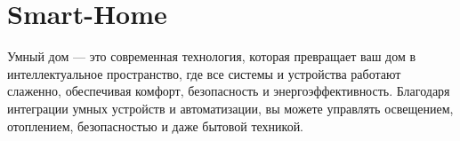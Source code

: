\chapter{Smart-\/\+Home}
\hypertarget{md__r_e_a_d_m_e}{}\label{md__r_e_a_d_m_e}
\label{md__r_e_a_d_m_e_autotoc_md0}%
%


Умный дом — это современная технология, которая превращает ваш дом в интеллектуальное пространство, где все системы и устройства работают слаженно, обеспечивая комфорт, безопасность и энергоэффективность. Благодаря интеграции умных устройств и автоматизации, вы можете управлять освещением, отоплением, безопасностью и даже бытовой техникой. 